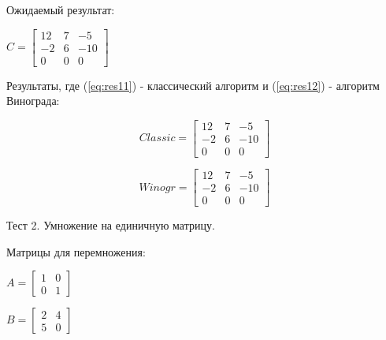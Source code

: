 \documentclass[12pt,a4paper]{scrartcl}
\begin{document}
	Ожидаемый результат:
	
	\begin{center}
		\begin{math}\label{eq:res1}
		C =\begin{bmatrix}
		12 & 7 & -5\\
		-2 & 6 & -10\\
		0 & 0 & 0
		\end{bmatrix}
		\end{math}
	\end{center}
	
	Результаты, где (\ref{eq:res11}) - классический алгоритм и (\ref{eq:res12}) - алгоритм Винограда:
	
	\begin{center}
		\begin{minipage}[c][3cm][c]{0,3\textwidth}
			\begin{equation}\label{eq:res11}
			Classic =\begin{bmatrix}
			12 & 7 & -5\\
			-2 & 6 & -10\\
			0 & 0 & 0
			\end{bmatrix}
			\end{equation}
		\end{minipage}
		\begin{minipage}[c][3cm][c]{0,3\textwidth}
			\begin{equation}\label{eq:res12}
			Winogr =\begin{bmatrix}
			12 & 7 & -5\\
			-2 & 6 & -10\\
			0 & 0 & 0
			\end{bmatrix}
			\end{equation}
		\end{minipage}
	\end{center}
	
	Тест 2. Умножение на единичную матрицу.
	
	Матрицы для перемножения:
	
	\begin{minipage}[c][3cm][c]{0,5\textwidth}
		\begin{math}\label{eq:test21}
		A =\begin{bmatrix}
		1 & 0 \\
		0 & 1
		\end{bmatrix}
		\end{math}
	\end{minipage}
	\begin{minipage}[c][3cm][c]{0,5\textwidth}
		\begin{math}\label{eq:test22}
		B =\begin{bmatrix}
		2 & 4 \\
		5 & 0 
		\end{bmatrix}
		\end{math}
	\end{minipage}
	
\end{document}
